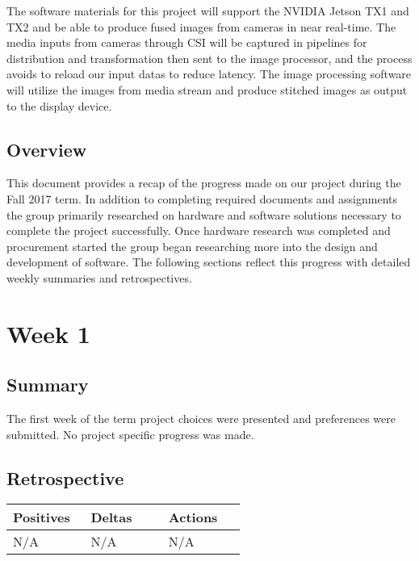 \documentclass[letterpaper,10pt,serif,draftclsnofoot,onecolumn,compsoc,titlepage]{IEEEtran}
\begin{document}
The software materials for this project will support the NVIDIA Jetson TX1 and TX2 and 
be able to produce fused images from cameras in near real-time. The media inputs from 
cameras through CSI will be captured in pipelines for distribution and transformation 
then sent to the image processor, and the process avoids to reload our input datas to 
reduce latency. The image processing software will utilize the images from media stream 
and produce stitched images as output to the display device.  \\


\subsection{Overview}

This document provides a recap of the progress made on our project during the 
Fall 2017 term. 
In addition to completing required documents and assignments the group primarily 
researched on hardware and software solutions necessary to complete the project 
successfully. Once hardware research was completed and procurement started the group 
began researching more into the design and development of software. The following 
sections reflect this progress with detailed weekly summaries and retrospectives. \\

\section{Week 1}

\subsection{Summary}

The first week of the term project choices were presented and preferences were
submitted. No project specific progress was made. \\

\subsection{Retrospective}

\begin{tabular}{|p{0.3\linewidth}|p{0.3\linewidth}|p{0.3\linewidth}|}
   \hline
   \textbf{Positives} & \textbf{Deltas} & \textbf{Actions}\\ 
   \hline
   N/A 
   & N/A 
   & N/A \\
   \hline
\end{tabular}
\end{document}
